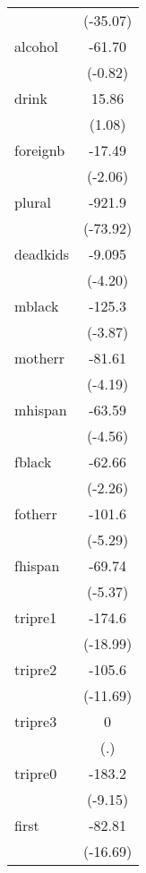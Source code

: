 {\begin{longtable}{l*{1}{c}}
            &    (-35.07)         \\
[1em]
alcohol     &      -61.70         \\
            &     (-0.82)         \\
[1em]
drink       &       15.86         \\
            &      (1.08)         \\
[1em]
foreignb    &      -17.49\sym{*}  \\
            &     (-2.06)         \\
[1em]
plural      &      -921.9\sym{***}\\
            &    (-73.92)         \\
[1em]
deadkids    &      -9.095\sym{***}\\
            &     (-4.20)         \\
[1em]
mblack      &      -125.3\sym{***}\\
            &     (-3.87)         \\
[1em]
motherr     &      -81.61\sym{***}\\
            &     (-4.19)         \\
[1em]
mhispan     &      -63.59\sym{***}\\
            &     (-4.56)         \\
[1em]
fblack      &      -62.66\sym{*}  \\
            &     (-2.26)         \\
[1em]
fotherr     &      -101.6\sym{***}\\
            &     (-5.29)         \\
[1em]
fhispan     &      -69.74\sym{***}\\
            &     (-5.37)         \\
[1em]
tripre1     &      -174.6\sym{***}\\
            &    (-18.99)         \\
[1em]
tripre2     &      -105.6\sym{***}\\
            &    (-11.69)         \\
[1em]
tripre3     &           0         \\
            &         (.)         \\
[1em]
tripre0     &      -183.2\sym{***}\\
            &     (-9.15)         \\
[1em]
first       &      -82.81\sym{***}\\
            &    (-16.69)         \\

\end{longtable}}
